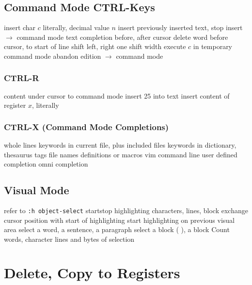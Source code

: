 \subsection{Command Mode CTRL-Keys}	{}
	{insert char $c$ literally, decimal value $n$}
	{insert previously inserted text, stop insert $\to$ command mode}
	{text completion before, after cursor}
	{delete word before cursor, to start of line}
	{shift left, right one shift width}
	{execute $c$ in temporary command mode}
	{abandon edition $\to$ command mode}
\subsubsection{CTRL-R}{}
	{content under cursor to command mode}
	{insert 25 into text}
	{insert content of register $x$, literally}
\subsubsection{CTRL-X (Command Mode Completions)}
	{whole lines}
	{keywords in current file, plus included files}
	{keywords in dictionary, thesaurus}
\cmdS{\ctrl{}X\ctrl{}]}	{tags}
	{file names}
	{definitions or macros}
	{vim command line}
	{user defined completion}
	{omni completion}

\subsection{Visual Mode}	{refer to {\tt :h object-select}}
	{start\or stop highlighting characters, lines, block}
	{exchange cursor position with start of highlighting}
	{start highlighting on previous visual area}
	{select a word, a sentence, a paragraph}
	{select a block ( ), a block {\tt\lapos}	{\tt\rapos}}
	{Count words, character lines and bytes of selection}

\section{Delete, Copy to Registers}	{}
